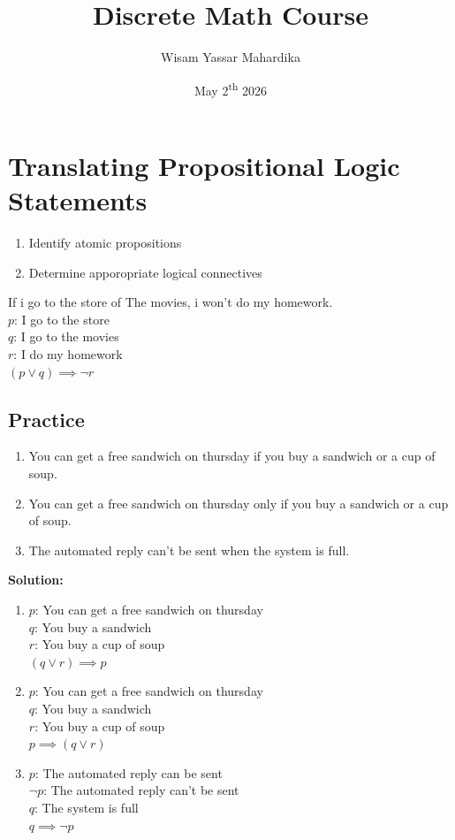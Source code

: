 \documentclass{article}
\title{Discrete Math Course}
\author{Wisam Yassar Mahardika}
\date{May 2\textsuperscript{th} 2026}
\begin{document}
\maketitle
\clearpage
\tableofcontents
\clearpage
\section{Translating Propositional Logic Statements}
\begin{enumerate}
	\item Identify atomic propositions
	\item Determine apporopriate logical connectives
\end{enumerate}
If i go to the store of The movies, i won't do my homework.\\
$ p $: I go to the store \\
$ q $: I go to the movies \\
$ r $: I do my homework \\


$(p \lor q) \implies \neg r$

\subsection{Practice}
\begin{enumerate}
	\item You can get a free sandwich on thursday if you buy a sandwich or a cup of soup.
	\item You can get a free sandwich on thursday only if you buy a sandwich or a cup of soup.
	\item The automated reply can't be sent when the system is full.

\end{enumerate}
\textbf{Solution:}
\begin{enumerate}
	\item $ p $: You can get a free sandwich on thursday \\
		$ q $: You buy a sandwich \\
		$ r $: You buy a cup of soup \\
		$ (q \lor r) \implies p $
	\item $ p $: You can get a free sandwich on thursday \\
		$ q $: You buy a sandwich \\
		$ r $: You buy a cup of soup \\
		$ p \implies (q \lor r) $
	\item $ p $: The automated reply can be sent \\
		$ \neg p $: The automated reply can't be sent \\
		$ q $: The system is full \\
		$ q \implies \neg p $
\end{enumerate}
\end{document}
